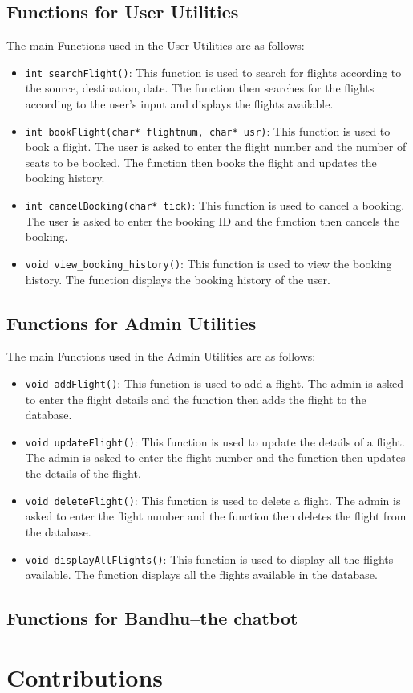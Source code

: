 \documentclass[a4paper]{scrartcl}
\begin{document}
\subsection{Functions for User Utilities}
The main Functions used in the User Utilities are as follows:
\begin{itemize}
    \item  \texttt{int searchFlight()}: This function is used to search for flights according to the source, destination, date. The function then searches for the flights according to the user's input and displays the flights available.\\
    \item \texttt{int bookFlight(char* flightnum, char* usr)}: This function is used to book a flight. The user is asked to enter the flight number and the number of seats to be booked. The function then books the flight and updates the booking history.\\
    \item \texttt{int cancelBooking(char* tick)}: This function is used to cancel a booking. The user is asked to enter the booking ID and the function then cancels the booking.\\
    \item \texttt{void view\_booking\_history()}: This function is used to view the booking history. The function displays the booking history of the user.\\
\end{itemize}
\subsection{Functions for Admin Utilities}
The main Functions used in the Admin Utilities are as follows:
\begin{itemize}
    \item \texttt{void addFlight()}: This function is used to add a flight. The admin is asked to enter the flight details and the function then adds the flight to the database.\\
    \item \texttt{void updateFlight()}: This function is used to update the details of a flight. The admin is asked to enter the flight number and the function then updates the details of the flight.\\
    \item \texttt{void deleteFlight()}: This function is used to delete a flight. The admin is asked to enter the flight number and the function then deletes the flight from the database.\\
    \item \texttt{void displayAllFlights()}: This function is used to display all the flights available. The function displays all the flights available in the database.\\
\end{itemize}
\subsection{Functions for Bandhu--the chatbot}
\section{Contributions}
\end{document}
